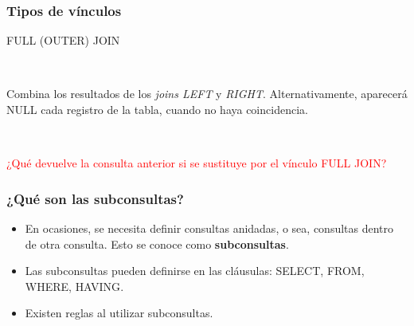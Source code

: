 \documentclass[
	10pt, %
	aspectratio=169, %
]{beamer}
\begin{document}

\begin{frame}[fragile]
	
	\frametitle{Tipos de vínculos}		
	
	\begin{center}
	
		\textcolor{codepurple}{FULL (OUTER) JOIN}
		
		\ 
		
		Combina los resultados de los \emph{joins LEFT} y \emph{RIGHT}. Alternativamente, aparecerá \textcolor{codepurple}{NULL} cada registro de la tabla, cuando no haya coincidencia.		
		
		\begin{venndiagram2sets}[
			labelA={ }, labelOnlyA={Tabla1}, 
			labelB={ }, labelOnlyB={Tabla2}, 
			showframe=false]
			\fillA
			\fillB
		\end{venndiagram2sets}
	
	\end{center}
	
	\pause
	
	\ 
	
	\textcolor{red}{¿Qué devuelve la consulta anterior si se sustituye por el vínculo  \textcolor{codepurple}{FULL JOIN}?}
		
\end{frame}


\begin{frame}[fragile]
	
	\frametitle{¿Qué son las subconsultas?}
	
	\begin{itemize}
		
		\item En ocasiones, se necesita definir consultas anidadas, o sea, consultas dentro de otra consulta. Esto se conoce como \textbf{subconsultas}. 
		
		\item Las subconsultas pueden definirse en las cláusulas: \textcolor{codepurple}{SELECT}, \textcolor{codepurple}{FROM}, \textcolor{codepurple}{WHERE}, \textcolor{codepurple}{HAVING}.
		
		\item Existen reglas al utilizar subconsultas.
		
	\end{itemize}
		
\end{frame}
\end{document}
